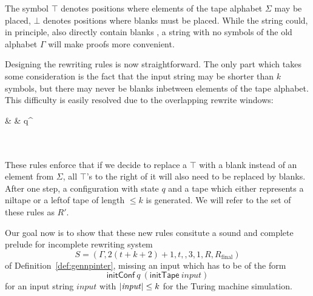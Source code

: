 \documentclass[a4paper,UKenglish,cleveref, autoref]{lipics-v2019}
\newcommand{\Rfinal}{R_{\text{final}}}
\begin{document}
The symbol $\top$ denotes positions where elements of the tape alphabet $\Sigma$ may be placed, $\bot$ denotes positions where blanks must be placed. While the string could, in principle, also directly contain blanks \blank{}, a string with no symbols of the old alphabet $\Gamma$ will make proofs more convenient. 

Designing the rewriting rules is now straightforward. The only part which takes some consideration is the fact that the input string may be shorter than $k$ symbols, but there may never be blanks inbetween elements of the tape alphabet. This difficulty is easily resolved due to the overlapping rewrite windows:
\begin{center}
  \rewwin{\bot & \bot & \bot}{\blank & \blank & \blank}
   {\blank & \blank & q^\blank}
   \\[3ex]
   \\[3ex]
  \rewwin{\top & \top & \top}{\blank & \blank & \blank} \\[3ex]
  \rewwin{\top & \top & \bot}{\blank & \blank & \blank} 
  \rewwin{\top & \bot & \bot}{\blank & \blank & \blank}
\end{center}

These rules enforce that if we decide to replace a $\top$ with a blank instead of an element from $\Sigma$, all $\top$'s to the right of it will also need to be replaced by blanks. After one step, a configuration with state $q$ and a tape which either represents a \textsf{niltape} or a \textsf{leftof} tape of length $\le k$ is generated. 
We will refer to the set of these rules as $R'$.

Our goal now is to show that these new rules consitute a sound and complete prelude for incomplete rewriting system 
\[S = (\Gamma, 2(t + k + 2) + 1, t, , 3, 1, R, \Rfinal)\]
of Definition~\ref{def:gennpinter}, missing an input which has to be of the form 
\[ \textsf{initConf}~q~(\textsf{initTape}~\mathit{input}) \]
for an input string $\mathit{input}$ with $|\mathit{input}| \le k$ for the Turing machine simulation.
\end{document}
